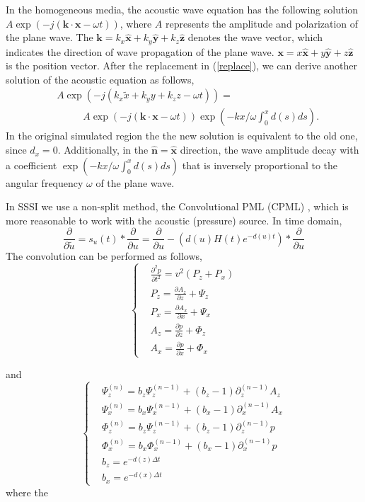 \documentclass[11pt]{article}
\newcommand{\bx}{\boldsymbol{x}}
\newcommand{\bk}{\boldsymbol{k}}
\newcommand{\hx}{\hat{\mathbf{x}}}
\newcommand{\hy}{\hat{\mathbf{y}}}
\newcommand{\hz}{\hat{\mathbf{z}}}
\theoremstyle{plain}
\theoremstyle{definition}
\theoremstyle{remark}
\numberwithin{equation}{section}
\begin{document}
In the homogeneous media, the acoustic wave equation has the following solution $A \exp(-j (\bk \cdot \bx -\omega t))$, where $A$ represents the amplitude and polarization of the plane wave. The $\bk = k_x \hx + k_y \hy +k_z \hz$ denotes the wave vector, which 
indicates the direction of wave propagation of the plane wave. $\bx = x\hx +y\hy +z \hz$ is the position vector. After the replacement in (\ref{replace}), we can derive another solution of the acoustic equation as follows,
\begin{equation}
\begin{aligned}
&A\exp(-j(k_x \tilde{x} + k_y y + k_z z -\omega t))=\\
 &~~~~~~~~~~~~A\exp(-j (\bk\cdot \bx -\omega t))\exp(-kx/\omega \int_0^x d(s)ds).
\end{aligned}
\end{equation}
In the original simulated region the the new solution is equivalent to the old one, since $d_x=0$. Additionally, in the $\hat{\mathbf{n}}= \hx$ direction, the wave amplitude decay with a coefficient $\exp(-kx/\omega \int_0^x d(s)ds)$ that is inversely proportional to the angular frequency $\omega$ of the plane wave. 

In SSSI we use a non-split method, the Convolutional PML (CPML) \cite{LueHun1992, RodGed2000, KomMar2007}, which is more reasonable to work with the acoustic (pressure) source. In time domain,
  \begin{equation}
    \frac{\partial}{\partial \tilde{u}} = s_u(t) * \frac{\partial}{\partial u} = \frac{\partial}{\partial u} - \left(d(u)H(t)e^{-d(u)t}\right) * \frac{\partial}{\partial u}
  \end{equation}
The convolution can be performed as follows,
  \begin{equation}
  \left\{
  \begin{aligned}
  &\frac{\partial^2 p}{\partial t^2}=v^2(P_z+P_x)\\
  &P_z=\frac{\partial A_z}{\partial z}+\Psi_z\\
  &P_x=\frac{\partial A_x}{\partial x}+\Psi_x\\
  &A_z=\frac{\partial p}{\partial z}+\Phi_z\\
  &A_x=\frac{\partial p}{\partial x}+\Phi_x
  \end{aligned}
  \right.
  \end{equation}
  
  and  
  \begin{equation}
  \left\{
  \begin{aligned}
  &\Psi_z^{(n)}=b_z\Psi_z^{(n-1)}+(b_z-1)\partial_z^{(n-1)}A_z\\
  &\Psi_x^{(n)}=b_x\Psi_x^{(n-1)}+(b_x-1)\partial_x^{(n-1)}A_x\\
  &\Phi_z^{(n)}=b_z\Psi_z^{(n-1)}+(b_z-1)\partial_z^{(n-1)}p\\
  &\Phi_x^{(n)}=b_x\Phi_x^{(n-1)}+(b_x-1)\partial_x^{(n-1)}p\\
  &b_z = e^{-d(z)\Delta t}\\
  &b_x = e^{-d(x)\Delta t}
  \end{aligned}
  \right.
  \end{equation}
where the 
\end{document}
